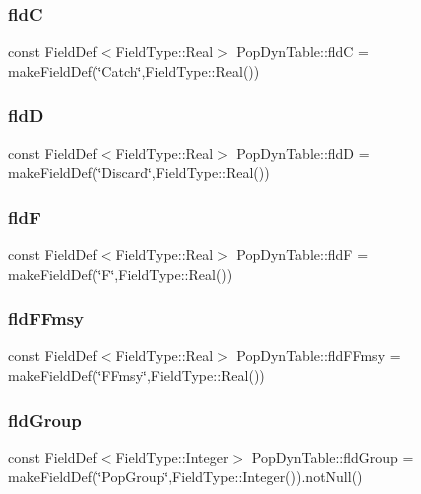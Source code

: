 \subsubsection{\texorpdfstring{fldC}{fldC}}
{\footnotesize\ttfamily const Field\+Def$<$Field\+Type\+::\+Real$>$ Pop\+Dyn\+Table\+::fldC = make\+Field\+Def(\char`\"{}Catch\char`\"{},Field\+Type\+::\+Real())}

\mbox{\label{class_pop_dyn_table_acc39c279338d923ddf4a70c66dab64e3}} 
\subsubsection{\texorpdfstring{fldD}{fldD}}
{\footnotesize\ttfamily const Field\+Def$<$Field\+Type\+::\+Real$>$ Pop\+Dyn\+Table\+::fldD = make\+Field\+Def(\char`\"{}Discard\char`\"{},Field\+Type\+::\+Real())}

\mbox{\label{class_pop_dyn_table_a50d22b3fd3483b1c237b5322f7dc11dc}} 
\subsubsection{\texorpdfstring{fldF}{fldF}}
{\footnotesize\ttfamily const Field\+Def$<$Field\+Type\+::\+Real$>$ Pop\+Dyn\+Table\+::fldF = make\+Field\+Def(\char`\"{}F\char`\"{},Field\+Type\+::\+Real())}

\mbox{\label{class_pop_dyn_table_a62af20a0049e86c3e963d0825700cf0d}} 
\subsubsection{\texorpdfstring{fldFFmsy}{fldFFmsy}}
{\footnotesize\ttfamily const Field\+Def$<$Field\+Type\+::\+Real$>$ Pop\+Dyn\+Table\+::fld\+F\+Fmsy = make\+Field\+Def(\char`\"{}F\+Fmsy\char`\"{},Field\+Type\+::\+Real())}

\mbox{\label{class_pop_dyn_table_a3e43d6c14cadec8feb0dcdec3b202939}} 
\subsubsection{\texorpdfstring{fldGroup}{fldGroup}}
{\footnotesize\ttfamily const Field\+Def$<$Field\+Type\+::\+Integer$>$ Pop\+Dyn\+Table\+::fld\+Group = make\+Field\+Def(\char`\"{}Pop\+Group\char`\"{},Field\+Type\+::\+Integer()).not\+Null()}

